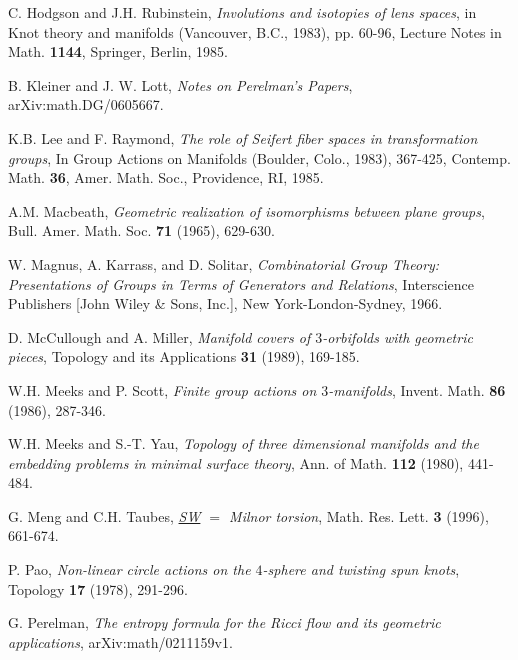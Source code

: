 \documentclass[11pt]{amsart}
\theoremstyle{plain}
\numberwithin{theorem}{section}
\theoremstyle{definition}
\begin{document}
\begin{thebibliography}{}
 C. Hodgson and J.H. Rubinstein, {\em Involutions and isotopies of lens spaces},
in Knot theory and manifolds (Vancouver, B.C., 1983), pp. 60-96, Lecture Notes in Math. {\bf 1144}, 
Springer, Berlin, 1985.

 B. Kleiner and J. W. Lott, {\em Notes on Perelman's Papers}, 
arXiv:math.DG/0605667.

 K.B. Lee and F. Raymond, {\em The role of Seifert fiber spaces in transformation
groups}, In Group Actions on Manifolds (Boulder, Colo., 1983), 367-425, Contemp. Math. {\bf 36},
Amer. Math. Soc., Providence, RI, 1985.

 A.M. Macbeath, {\em Geometric realization of isomorphisms between plane groups},
Bull. Amer. Math. Soc. {\bf 71} (1965), 629-630.          

 W. Magnus, A. Karrass, and D. Solitar, {\em Combinatorial Group Theory: Presentations of
Groups in Terms of Generators and Relations}, Interscience Publishers [John Wiley \& Sons, Inc.], 
New York-London-Sydney, 1966.
                                 
 D. McCullough and A. Miller, {\em Manifold covers of $3$-orbifolds with 
                      geometric pieces},
                     Topology and its Applications {\bf 31} (1989), 169-185.                                  

 W.H. Meeks and P. Scott, {\em Finite group actions on $3$-manifolds}, 
                       Invent. Math. {\bf 86} (1986), 287-346.
                       
 W.H. Meeks and S.-T. Yau, {\em Topology of three dimensional manifolds 
                                  and the embedding problems in minimal surface theory}, 
                                  Ann. of Math. {\bf 112} (1980), 441-484.

 G. Meng and C.H. Taubes, {\em \underline{SW} $=$ Milnor torsion}, Math. Res.
Lett. {\bf 3} (1996), 661-674.                                  
                                  
 P. Pao, {\em Non-linear circle actions on the $4$-sphere and twisting spun knots},
                         Topology {\bf 17} (1978), 291-296.                                   
                       
 G. Perelman, {\em The entropy formula for the Ricci flow and its geometric applications},
                arXiv:math/0211159v1.
 

\end{thebibliography}
\end{document}
